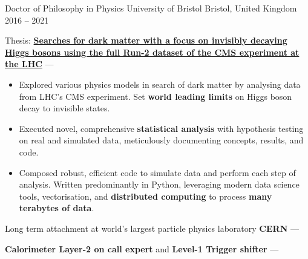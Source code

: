 
\newcommand{\vPaddingLength}{0.75mm}
\newcommand{\vpaddingEduSubpoint}{\vspace{\vPaddingLength}} %


\begin{cventries}
    \cventry
        {Doctor of Philosophy in Physics} %
        {University of Bristol} %
        {Bristol, United Kingdom} %
        {2016 -- 2021} %
        {
        \begin{cvitems} %
            \item {Thesis: \textbf{\href{https://research-information.bris.ac.uk/en/studentTheses/the-dark-side-of-the-higgs}{Searches for dark matter with a focus on invisibly decaying Higgs bosons using the full Run-2 dataset of the CMS experiment at the LHC}} --- }
            \vpaddingEduSubpoint
            \begin{itemize}[itemsep=\vPaddingLength, label=\bullet]
                \item{Explored various physics models in search of dark matter by analysing data from LHC's CMS experiment. Set \textbf{world leading limits} on Higgs boson decay to invisible states.}
                \item{Executed novel, comprehensive \textbf{statistical analysis} with hypothesis testing on real and simulated data, meticulously documenting concepts, results, and code.}
                \item{Composed robust, efficient code to simulate data and perform each step of analysis. Written predominantly in Python, leveraging modern data science tools, vectorisation, and \textbf{distributed computing} to process \textbf{many terabytes of data}.}
            \end{itemize}
            \item {Long term attachment at world's largest particle physics laboratory \textbf{CERN} --- }
            \item {\textbf{Calorimeter Layer-2 on call expert} and \textbf{Level-1 Trigger shifter} --- }

\end{cvitems}}
\end{cventries}
